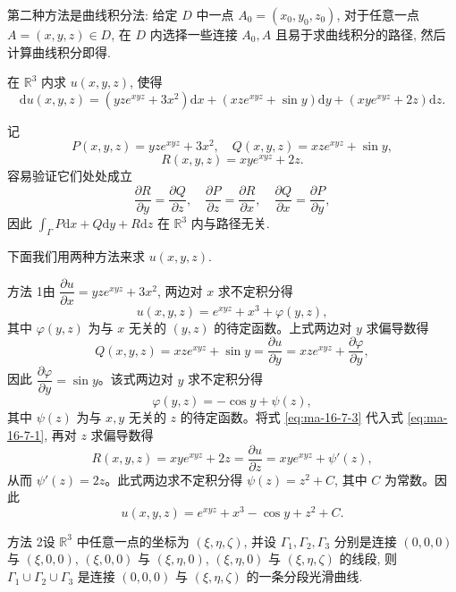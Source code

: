 第二种方法是曲线积分法: 给定 $D$ 中一点 $A_0=(x_0,y_0,z_0)$, 对于任意一点 $A=(x,y,z)\in D$, 在 $D$ 内选择一些连接 $A_0,A$ 且易于求曲线积分的路径, 然后计算曲线积分即得.

\begin{example}\label{example:ma-16-7-3}
在 $\mathbb R^3$ 内求 $u(x,y,z)$, 使得
\[
  \mathrm du(x,y,z)=(yze^{xyz}+3x^2)\mathrm dx+(xze^{xyz}+\sin y)\mathrm dy+(xye^{xyz}+2z)\mathrm dz.
\]
\end{example}


\begin{solve}
记
\[
  P(x,y,z)=yze^{xyz}+3x^2,\quad Q(x,y,z)=xze^{xyz}+\sin y,
\]
\[
  R(x,y,z)=xye^{xyz}+2z.
\]
容易验证它们处处成立
\[
  \frac{\partial R}{\partial y}=\frac{\partial Q}{\partial z},\quad
  \frac{\partial P}{\partial z}=\frac{\partial R}{\partial x},\quad
  \frac{\partial Q}{\partial x}=\frac{\partial P}{\partial y},
\]
因此 $\int_\Gamma P\mathrm dx+Q\mathrm dy+R\mathrm dz$ 在 $\mathbb R^3$ 内与路径无关.

下面我们用两种方法来求 $u(x,y,z)$.

方法 1\quad 由 $\dfrac{\partial u}{\partial x}=yze^{xyz}+3x^2$, 两边对 $x$ 求不定积分得
\begin{equation}
  u(x,y,z)=e^{xyz}+x^3+\varphi(y,z),
  \label{eq:ma-16-7-1}
\end{equation}
其中 $\varphi(y,z)$ 为与 $x$ 无关的 $(y,z)$ 的待定函数。上式两边对 $y$ 求偏导数得
\begin{equation}
  Q(x,y,z)=xze^{xyz}+\sin y
  =\frac{\partial u}{\partial y}
  =xze^{xyz}+\frac{\partial\varphi}{\partial y},
  \label{eq:ma-16-7-2}
\end{equation}
因此 $\dfrac{\partial\varphi}{\partial y}=\sin y$。该式两边对 $y$ 求不定积分得
\begin{equation}
  \varphi(y,z)=-\cos y+\psi(z),
  \label{eq:ma-16-7-3}
\end{equation}
其中 $\psi(z)$ 为与 $x,y$ 无关的 $z$ 的待定函数。将式 \eqref{eq:ma-16-7-3} 代入式 \eqref{eq:ma-16-7-1}, 再对 $z$ 求偏导数得
\[
  R(x,y,z)=xye^{xyz}+2z=\frac{\partial u}{\partial z}=xye^{xyz}+\psi'(z),
\]
从而 $\psi'(z)=2z$。此式两边求不定积分得 $\psi(z)=z^2+C$, 其中 $C$ 为常数。因此
\[
  u(x,y,z)=e^{xyz}+x^3-\cos y+z^2+C.
\]

方法 2\quad 设 $\mathbb R^3$ 中任意一点的坐标为 $(\xi,\eta,\zeta)$, 并设 $\Gamma_1,\Gamma_2,\Gamma_3$ 分别是连接 $(0,0,0)$ 与 $(\xi,0,0)$, $(\xi,0,0)$ 与 $(\xi,\eta,0)$, $(\xi,\eta,0)$ 与 $(\xi,\eta,\zeta)$ 的线段, 则 $\Gamma_1\cup\Gamma_2\cup\Gamma_3$ 是连接 $(0,0,0)$ 与 $(\xi,\eta,\zeta)$ 的一条分段光滑曲线.


\end{solve}
